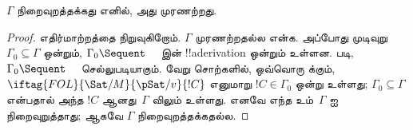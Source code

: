 \documentclass[../../../include/open-logic-section]{subfiles}
\begin{document}
\begin{cor}
$\Gamma$ நிறைவுறத்தக்கது எனில், அது முரணற்றது.
\end{cor}

\begin{proof}
எதிர்மாற்றத்தை நிறுவுகிறோம். $\Gamma$ முரணற்றதல்ல என்க. அப்போது முடிவுறு
$\Gamma_0 \subseteq \Gamma$ ஒன்றும், $\Gamma_0 \Sequent \quad$ இன்
!!a{derivation} ஒன்றும் உள்ளன.  படி,
$\Gamma_0 \Sequent \quad$ செல்லுபடியாகும். வேறு சொற்களில், ஒவ்வொரு
 க்கும்,
$\iftag{FOL}{\Sat/{M}}{\pSat/{v}}{!C}$ எனுமாறு $!C \in \Gamma_0$ ஒன்று
உள்ளது; $\Gamma_0 \subseteq \Gamma$ என்பதால் அந்த $!C$ ஆனது~$\Gamma$ விலும்
உள்ளது. எனவே எந்த  உம்~$\Gamma$ ஐ
நிறைவுறுத்தாது; ஆகவே $\Gamma$ நிறைவுறத்தக்கதல்ல.
\end{proof}
\end{document}
